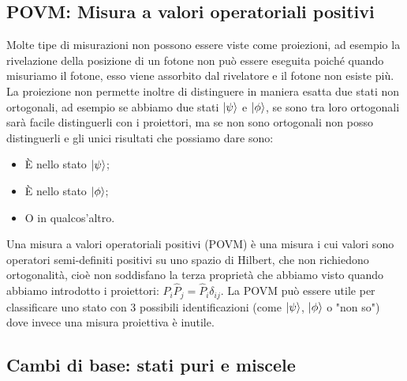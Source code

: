 \subsection{POVM: Misura a valori operatoriali positivi}
Molte tipe di misurazioni non possono essere viste come proiezioni, ad esempio la rivelazione della posizione di un fotone non può essere eseguita poiché quando misuriamo il fotone, esso viene assorbito dal rivelatore e il fotone non esiste più. La proiezione non permette inoltre di distinguere in maniera esatta due stati non ortogonali, ad esempio se abbiamo due stati $\ket \psi$ e $\ket \phi$, se sono tra loro ortogonali sarà facile distinguerli con i proiettori, ma se non sono ortogonali non posso distinguerli e gli unici risultati che possiamo dare sono:
\begin{itemize}
    \item È nello stato $\ket \psi$;
    \item È nello stato $\ket \phi$;
    \item O in qualcos'altro.
\end{itemize}
Una misura a valori operatoriali positivi (POVM) è una misura i cui valori sono operatori semi-definiti positivi su uno spazio di Hilbert, che non richiedono ortogonalità, cioè non soddisfano la terza proprietà che abbiamo visto quando abbiamo introdotto i proiettori: $\hat P_i \hat P_j = \hat P_i\delta_{ij}$. La POVM può essere utile per classificare uno stato con 3 possibili identificazioni (come $\ket \psi$, $\ket \phi$ o "non so") dove invece una misura proiettiva è inutile.

\subsection{Cambi di base: stati puri e miscele}

